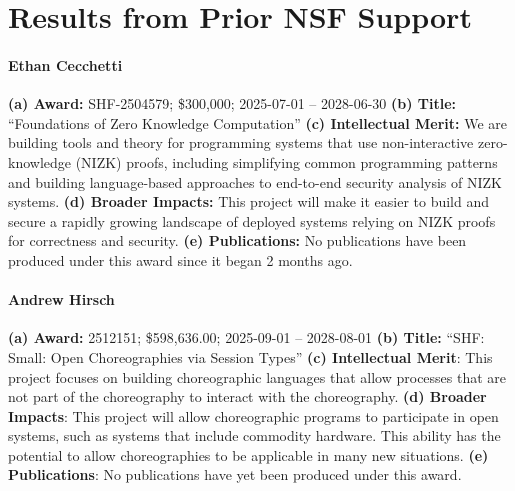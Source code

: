 \section{Results from Prior NSF Support}
\label{sec:prior_results}

\paragraph{Ethan Cecchetti}
\textbf{(a) Award:} SHF-2504579; \$300,000; 2025-07-01 -- 2028-06-30
\textbf{(b) Title:} ``Foundations of Zero Knowledge Computation''
\textbf{(c) Intellectual Merit:} We are building tools and theory for programming systems that use non-interactive zero-knowledge (NIZK) proofs,
including simplifying common programming patterns and building language-based approaches to end-to-end security analysis of NIZK systems.
\textbf{(d) Broader Impacts:} This project will make it easier to build and secure a rapidly growing landscape of deployed systems relying on NIZK proofs for correctness and security.
\textbf{(e) Publications:} No publications have been produced under this award since it began 2 months ago.

\paragraph{Andrew Hirsch}
\textbf{(a) Award:} 2512151; \$598,636.00; 2025-09-01 -- 2028-08-01
\textbf{(b) Title:} ``SHF: Small: Open Choreographies via Session Types''
\textbf{(c) Intellectual Merit}: This project focuses on building choreographic languages that allow processes that are not part of the choreography to interact with the choreography.
\textbf{(d) Broader Impacts}: This project will allow choreographic programs to participate in open systems, such as systems that include commodity hardware.
This ability has the potential to allow choreographies to be applicable in many new situations.
\textbf{(e) Publications}: No publications have yet been produced under this award.


